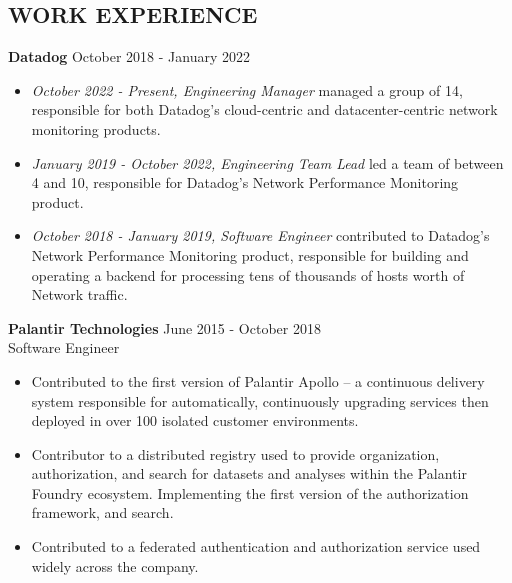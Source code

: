 \documentclass[line,margin]{res}
\begin{document}
\address{leeavital@gmail.com}

\begin{resume}

\section{WORK EXPERIENCE}

{\bf Datadog} \hfill October 2018 - January 2022 \\
\begin{itemize}
  \item \textit{October 2022 - Present, Engineering Manager} managed a group of 14, responsible for both Datadog's cloud-centric and datacenter-centric network monitoring products.
  \item \textit{January 2019 - October 2022, Engineering Team Lead} led a team of between 4 and 10, responsible for Datadog's Network Performance Monitoring product.
  \item \textit{October 2018 - January 2019, Software Engineer} contributed to Datadog's Network Performance Monitoring product, responsible for building and operating a backend for processing tens of thousands of hosts worth of Network traffic.
\end{itemize}

{\bf Palantir Technologies} \hfill June 2015 - October 2018 \\
Software Engineer
\begin{itemize}
\item Contributed to the first version of Palantir Apollo -- a continuous delivery system responsible for automatically, continuously upgrading services then deployed in over 100 isolated customer environments.
\item Contributor to a distributed registry used to provide organization, authorization, and search for datasets and analyses within the Palantir Foundry ecosystem. Implementing the first version of the authorization framework, and search.
\item Contributed to a federated authentication and authorization service used widely across the company.
\end{itemize}



\end{resume}
\end{document}

